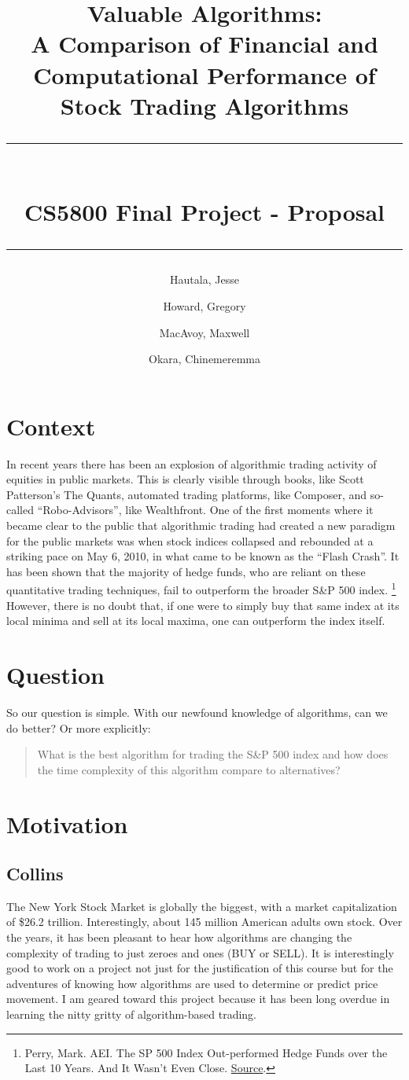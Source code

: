 \documentclass[12pt,english]{article}
\title{
    \textbf{Valuable Algorithms:}\\
    A Comparison of Financial and Computational Performance of Stock Trading Algorithms\\
    \rule[3mm]{\textwidth}{1pt}\\
    \large CS5800 Final Project - Proposal\\
    \rule{\textwidth}{1pt}
}
\author{Hautala, Jesse \and Howard, Gregory \and MacAvoy, Maxwell \and Okara, Chinemeremma}
\begin{document}
\maketitle

\section*{Context}
In recent years there has been an explosion of algorithmic trading activity of equities in public markets. This is clearly visible through books, like Scott Patterson’s The Quants, automated trading platforms, like Composer, and so-called “Robo-Advisors”, like Wealthfront. One of the first moments where it became clear to the public that algorithmic trading had created a new paradigm for the public markets was when stock indices collapsed and rebounded at a striking pace on May 6, 2010, in what came to be known as the “Flash Crash”.
\newline\newline
It has been shown that the majority of hedge funds, who are reliant on these quantitative trading techniques, fail to outperform the broader S\&P 500 index.
\footnote{Perry, Mark. AEI. The SP 500 Index Out-performed Hedge Funds over the Last 10 Years. And It Wasn’t Even Close. \href{https://www.aei.org/carpe-diem/the-sp-500-index-out-performed-hedge-funds-over-the-last-10-years-and-it-wasnt-even-close/}{Source}.}
However, there is no doubt that, if one were to simply buy that same index at its local minima and sell at its local maxima, one can outperform the index itself.
\newpage
\section*{Question}
So our question is simple. With our newfound knowledge of algorithms, can we do better? Or more explicitly:
\begin{quote}
What is the best algorithm for trading the S\&P 500 index and how does the time complexity of this algorithm compare to alternatives?
\end{quote}

\section*{Motivation}
\subsection*{Collins}
The New York Stock Market is globally the biggest, with a market capitalization of \$26.2 trillion. Interestingly, about 145 million American adults own stock. Over the years, it has been pleasant to hear how algorithms are changing the complexity of trading to just zeroes and ones (BUY or SELL). It is interestingly good to work on a project not just for the justification of this course but for the adventures of knowing how algorithms are used to determine or predict price movement. I am geared toward this project because it has been long overdue in learning the nitty gritty of algorithm-based trading.
\end{document}
